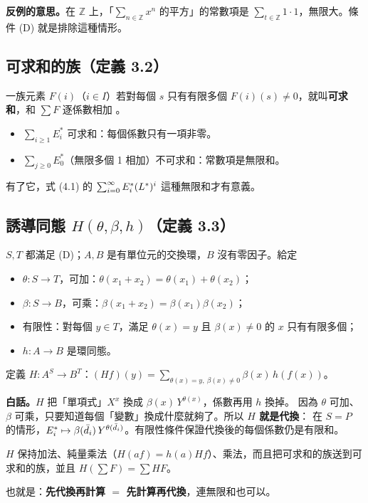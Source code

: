 \textbf{反例的意思。}在 $\mathbb Z$ 上，「$\sum_{n\in\mathbb Z}x^n$ 的平方」的常數項是 $\sum_{t\in\mathbb Z}1\cdot1$，無限大。條件 (D) 就是排除這種情形。

\subsection{可求和的族（定義 3.2）}

一族元素 $F(i)$（$i\in I$）若對每個 $s$ 只有有限多個 $F(i)(s)\neq0$，就叫\textbf{可求和}，和 $\sum F$ 逐係數相加 。
\begin{itemize}
  \item $\sum_{i\ge1}E_i^*$ 可求和：每個係數只有一項非零。
  \item $\sum_{j\ge0}E_0^*$（無限多個 1 相加）不可求和：常數項是無限和。
\end{itemize}
有了它，式 (4.1) 的 $\sum_{i=0}^\infty E_i^*(L^{*})^i$ 這種無限和才有意義。

\subsection{誘導同態 $H(\theta,\beta,h)$（定義 3.3）}

\begin{thmbox}[定義 3.3 \paper{p.~445}]
$S,T$ 都滿足 (D)；$A,B$ 是有單位元的交換環，$B$ 沒有零因子。給定
\begin{itemize}[leftmargin=1.4em]
  \item $\theta:S\to T$，可加：$\theta(x_1+x_2)=\theta(x_1)+\theta(x_2)$；
  \item $\beta:S\to B$，可乘：$\beta(x_1+x_2)=\beta(x_1)\beta(x_2)$；
  \item 有限性：對每個 $y\in T$，滿足 $\theta(x)=y$ 且 $\beta(x)\neq0$ 的 $x$ 只有有限多個；
  \item $h:A\to B$ 是環同態。
\end{itemize}
定義 $H:A^S\to B^T$：$(Hf)(y)=\sum_{\theta(x)=y,\ \beta(x)\ne0}\beta(x)\,h(f(x))$。
\end{thmbox}

\textbf{白話。}$H$ 把「單項式」$X^x$ 換成 $\beta(x)\,Y^{\theta(x)}$，係數再用 $h$ 換掉。
因為 $\theta$ 可加、$\beta$ 可乘，只要知道每個「變數」換成什麼就夠了。所以 \textbf{$H$ 就是代換}：
在 $S=P$ 的情形，$E_i^*\mapsto\beta(\bar d_i)\,Y^{\theta(\bar d_i)}$。有限性條件保證代換後的每個係數仍是有限和。

\begin{thmbox}[引理 3.1 \paper{p.~445}]
$H$ 保持加法、純量乘法（$H(af)=h(a)Hf$）、乘法，而且把可求和的族送到可求和的族，並且 $H(\sum F)=\sum HF$。
\end{thmbox}
也就是：\textbf{先代換再計算 $=$ 先計算再代換}，連無限和也可以。

